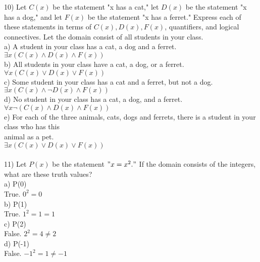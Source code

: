 \documentclass{article}
\begin{document}
\begin{flushleft}
\setlength\parindent{0pt}10) Let $C(x)$ be the statement "x has a cat," let $D(x)$ be the statement "x has a dog," and let $F(x)$ be the statement "x has a ferret."  Express each of these statements in terms of $C(x), D(x), F(x)$, quantifiers, and logical connectives.  Let the domain consist of all students in your class.\\
\setlength\parindent{24pt}a) A student in your class has a cat, a dog and a ferret. \\
\setlength\parindent{48pt} $\exists x (C(x) \land D(x) \land F(x))$ \\
\setlength\parindent{24pt}b) All students in your class have a cat, a dog, or a ferret. \\
\setlength\parindent{48pt} $\forall x (C(x) \lor D(x) \lor F(x))$ \\
\setlength\parindent{24pt}c) Some student in your class has a cat and a ferret, but not a dog.  \\
\setlength\parindent{48pt} $\exists x (C(x) \land \neg D(x) \land F(x))$ \\
\setlength\parindent{24pt}d) No student in your class has a cat, a dog, and a ferret.\\ 
\setlength\parindent{48pt} $\forall x \neg (C(x) \land D(x) \land F(x))$\\
\setlength\parindent{24pt}e) For each of the three animals, cats, dogs and ferrets, there is a student in your class who has this \\
\setlength\parindent{24pt}animal as a pet.  \\
\setlength\parindent{48pt} $\exists x (C(x) \lor D(x) \lor F(x))$\\
~\\\setlength\parindent{0pt}11) Let $P(x)$ be the statement $"x = x^2."$  If the domain consists of the integers, what are these truth values?\\
\setlength\parindent{24pt}a) P(0) \\
\setlength\parindent{48pt} True.  $0^2 = 0$ \\
\setlength\parindent{24pt}b) P(1) \\
\setlength\parindent{48pt} True.  $1^2 = 1 = 1$ \\
\setlength\parindent{24pt}c) P(2) \\ 
\setlength\parindent{48pt} False.  $2^2 = 4 \neq 2$ \\
\setlength\parindent{24pt}d) P(-1) \\
\setlength\parindent{48pt} False.  $-1^2 = 1 \neq -1$ \\

\end{flushleft}
\end{document}
